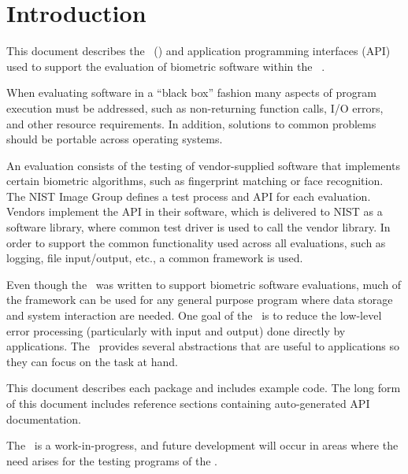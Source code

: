 \chapter{Introduction}

This document describes the \lname\ (\sname) and application programming 
interfaces (API) used to support the evaluation of biometric software within 
the \nistig\ \cite{org:nist:imagegroup}.

When evaluating software in a ``black box'' fashion many aspects
of program execution must be addressed, such as non-returning function calls,
I/O errors, and other resource requirements. In addition, solutions to common
problems should be portable across operating systems.

An evaluation consists of the testing of vendor-supplied
software that implements certain biometric algorithms, such as fingerprint
matching or face recognition. The NIST Image Group defines a test process
and API for each evaluation. Vendors implement the API in their software, which
is delivered to NIST as a software library, where common test driver is used to
call the vendor library.
In order to support the common functionality used across all evaluations, such
as logging, file input/output, etc., a common framework is used.

Even though the \lname\ was written to support biometric software evaluations,
much of the framework can be used for any general purpose program where data
storage and system interaction are needed. One goal of the \sname\ is to
reduce the low-level error processing (particularly with input and output)
done directly by applications. The \lname\ provides several abstractions that
are useful to applications so they can focus on the task at hand.

This document describes each package and includes example code. The long form
of this document includes reference sections containing auto-generated API
documentation.

The \sname\ is a work-in-progress, and future development will occur in areas
where the need arises for the testing programs of the \nistig.
